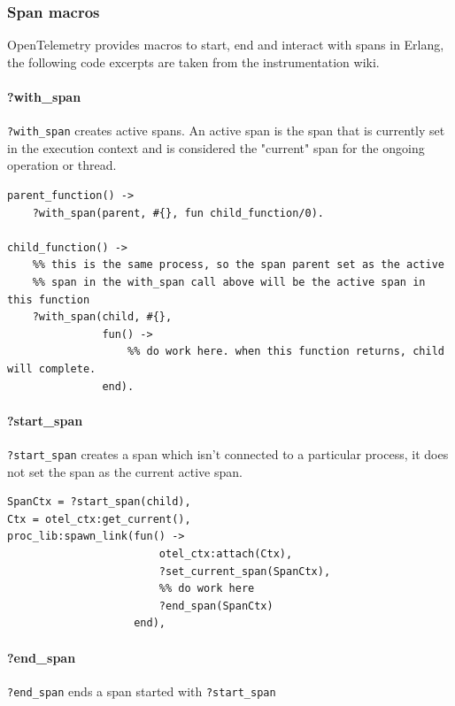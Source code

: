     \subsubsection{Span macros}
        OpenTelemetry provides macros to start, end and interact with spans in Erlang, the following code excerpts are taken from the instrumentation wiki. \cite{otel-in}
        \paragraph{?with\_span}
            \texttt{?with\_span} creates active spans. An active span is the span that is currently set in the execution context and is considered the "current" span for the ongoing operation or thread. \cite{active-s}
        \begin{verbatim}
parent_function() ->
    ?with_span(parent, #{}, fun child_function/0).

child_function() ->
    %% this is the same process, so the span parent set as the active
    %% span in the with_span call above will be the active span in this function
    ?with_span(child, #{},
               fun() ->
                   %% do work here. when this function returns, child will complete.
               end).
        \end{verbatim}

        \paragraph{?start\_span}
            \texttt{?start\_span} creates a span which isn't connected to a particular process, it does not set the span as the current active span.
        \begin{verbatim}
SpanCtx = ?start_span(child),
Ctx = otel_ctx:get_current(),
proc_lib:spawn_link(fun() ->
                        otel_ctx:attach(Ctx),
                        ?set_current_span(SpanCtx),
                        %% do work here
                        ?end_span(SpanCtx)
                    end),
        \end{verbatim}

        \paragraph{?end\_span}
            \texttt{?end\_span} ends a span started with \texttt{?start\_span}

